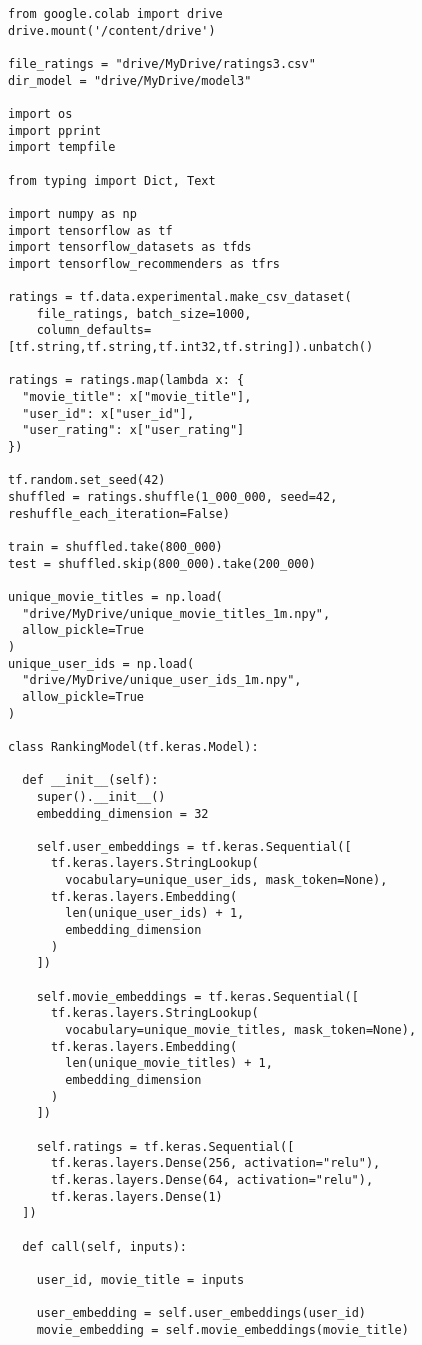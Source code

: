 \begin{verbatim}
from google.colab import drive
drive.mount('/content/drive')

file_ratings = "drive/MyDrive/ratings3.csv"
dir_model = "drive/MyDrive/model3"

import os
import pprint
import tempfile

from typing import Dict, Text

import numpy as np
import tensorflow as tf
import tensorflow_datasets as tfds
import tensorflow_recommenders as tfrs

ratings = tf.data.experimental.make_csv_dataset(
    file_ratings, batch_size=1000,
    column_defaults=[tf.string,tf.string,tf.int32,tf.string]).unbatch()

ratings = ratings.map(lambda x: {
  "movie_title": x["movie_title"],
  "user_id": x["user_id"],
  "user_rating": x["user_rating"]
})

tf.random.set_seed(42)
shuffled = ratings.shuffle(1_000_000, seed=42, reshuffle_each_iteration=False)

train = shuffled.take(800_000)
test = shuffled.skip(800_000).take(200_000)

unique_movie_titles = np.load(
  "drive/MyDrive/unique_movie_titles_1m.npy",
  allow_pickle=True
)
unique_user_ids = np.load(
  "drive/MyDrive/unique_user_ids_1m.npy",
  allow_pickle=True
)

class RankingModel(tf.keras.Model):

  def __init__(self):
    super().__init__()
    embedding_dimension = 32

    self.user_embeddings = tf.keras.Sequential([
      tf.keras.layers.StringLookup(
        vocabulary=unique_user_ids, mask_token=None),
      tf.keras.layers.Embedding(
        len(unique_user_ids) + 1,
        embedding_dimension
      )
    ])

    self.movie_embeddings = tf.keras.Sequential([
      tf.keras.layers.StringLookup(
        vocabulary=unique_movie_titles, mask_token=None),
      tf.keras.layers.Embedding(
        len(unique_movie_titles) + 1,
        embedding_dimension
      )
    ])

    self.ratings = tf.keras.Sequential([
      tf.keras.layers.Dense(256, activation="relu"),
      tf.keras.layers.Dense(64, activation="relu"),
      tf.keras.layers.Dense(1)
  ])

  def call(self, inputs):

    user_id, movie_title = inputs

    user_embedding = self.user_embeddings(user_id)
    movie_embedding = self.movie_embeddings(movie_title)


\end{verbatim}
